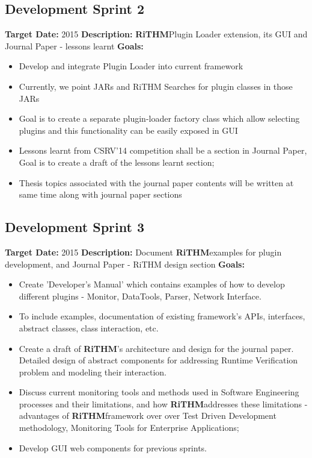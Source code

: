 \documentclass[]{article}
\newcommand{\rithm}{\textbf{RiTHM}\space}
\begin{document}
\subsection{Development Sprint 2}
\textbf{Target Date:}\space {} {2015}\newline
\textbf{Description:} \rithm Plugin Loader extension,  its GUI and Journal Paper - lessons learnt\newline
\textbf{Goals:}
\begin{itemize}
\item
Develop and integrate Plugin Loader into current framework
\item
Currently, we point JARs and RiTHM Searches for plugin classes in those JARs
\item
Goal is to create a separate plugin-loader factory class which allow selecting plugins and this functionality can be
easily exposed in GUI
\item
Lessons learnt from CSRV'14 competition shall be a section in Journal Paper, Goal is to create a draft of the lessons learnt section; 
\item
Thesis topics associated with the journal paper contents will be written at same time along with journal paper sections 
\end{itemize}

\subsection{Development Sprint 3}
\textbf{Target Date:}\space {} {2015}\newline
\textbf{Description:} Document \rithm examples for plugin development, and Journal Paper - RiTHM design section\newline
\textbf{Goals:}
\begin{itemize}
	\item
	Create 'Developer's Manual' which contains examples of how to develop different plugins - Monitor, DataTools, Parser, Network Interface.
	\item
	To include examples, documentation of existing framework's APIs, interfaces, abstract classes, class interaction, etc.
	\item
	Create a draft of \rithm's architecture and design for the journal paper. Detailed design of abstract components for addressing Runtime Verification problem and modeling their interaction.
	\item
	Discuss current monitoring tools and methods used in Software Engineering processes and their limitations, and how \rithm addresses these limitations - advantages of \rithm framework over over Test Driven Development methodology, Monitoring Tools for Enterprise Applications; 
	\item
	Develop GUI web components for previous sprints. 
\end{itemize}
\end{document}

